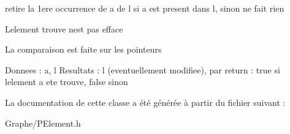 retire la 1ere occurrence de a de l si a est present dans l, sinon ne fait rien

L\textquotesingle{}element trouve n\textquotesingle{}est pas efface

La comparaison est faite sur les pointeurs

Donnees \+: a, l Resultats \+: l (eventuellement modifiee), par return \+: true si l\textquotesingle{}element a ete trouve, false sinon 

La documentation de cette classe a été générée à partir du fichier suivant \+:\begin{DoxyCompactItemize}
\item 
Graphe/P\+Element.\+h\end{DoxyCompactItemize}
